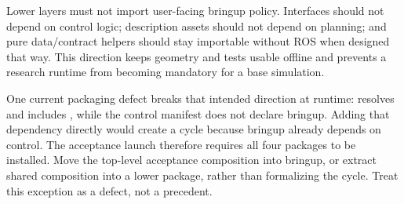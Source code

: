 Lower layers must not import user-facing bringup policy. Interfaces should not
depend on control logic; description assets should not depend on planning; and
pure data/contract helpers should stay importable without ROS when designed
that way. This direction keeps geometry and tests usable offline and prevents a
research runtime from becoming mandatory for a base simulation.

One current packaging defect breaks that intended direction at runtime:
resolves and includes
, while the control
manifest does not declare bringup. Adding that dependency directly would create
a cycle because bringup already depends on control. The acceptance launch
therefore requires all four packages to be installed. Move the top-level
acceptance composition into bringup, or extract shared composition into a lower
package, rather than formalizing the cycle. Treat this exception as a defect,
not a precedent.
